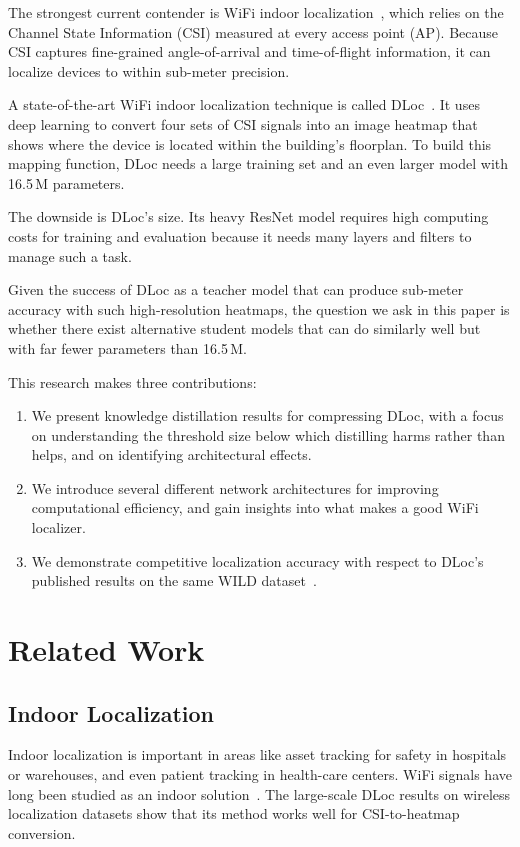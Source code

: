 \documentclass[conference]{IEEEtran}
\begin{document}
The strongest current contender is WiFi indoor localization~\cite{ayyalasomayajula2020deep}, which relies on the Channel State Information (CSI) measured at every access point (AP). Because CSI captures fine-grained angle-of-arrival and time-of-flight information, it can localize devices to within sub-meter precision.

A state-of-the-art WiFi indoor localization technique is called DLoc~\cite{ayyalasomayajula2020deep}. It uses deep learning to convert four sets of CSI signals into an image heatmap that shows where the device is located within the building's floorplan. To build this mapping function, DLoc needs a large training set and an even larger model with 16.5\,M parameters.

The downside is DLoc's size. Its heavy ResNet model requires high computing costs for training and evaluation because it needs many layers and filters to manage such a task.

Given the success of DLoc as a teacher model that can produce sub-meter accuracy with such high-resolution heatmaps, the question we ask in this paper is whether there exist alternative student models that can do similarly well but with far fewer parameters than 16.5\,M.

This research makes three contributions:
\begin{enumerate}
\item We present knowledge distillation results for compressing DLoc, with a focus on understanding the threshold size below which distilling harms rather than helps, and on identifying architectural effects.
\item We introduce several different network architectures for improving computational efficiency, and gain insights into what makes a good WiFi localizer.
\item We demonstrate competitive localization accuracy with respect to DLoc's published results on the same WILD dataset~\cite{ayyalasomayajula2020deep}.
\end{enumerate}

\section{Related Work}
\subsection{Indoor Localization}
Indoor localization is important in areas like asset tracking for safety in hospitals or warehouses, and even patient tracking in health-care centers. WiFi signals have long been studied as an indoor solution~\cite{ayyalasomayajula2020deep}. The large-scale DLoc results on wireless localization datasets show that its method works well for CSI-to-heatmap conversion.
\end{document}
